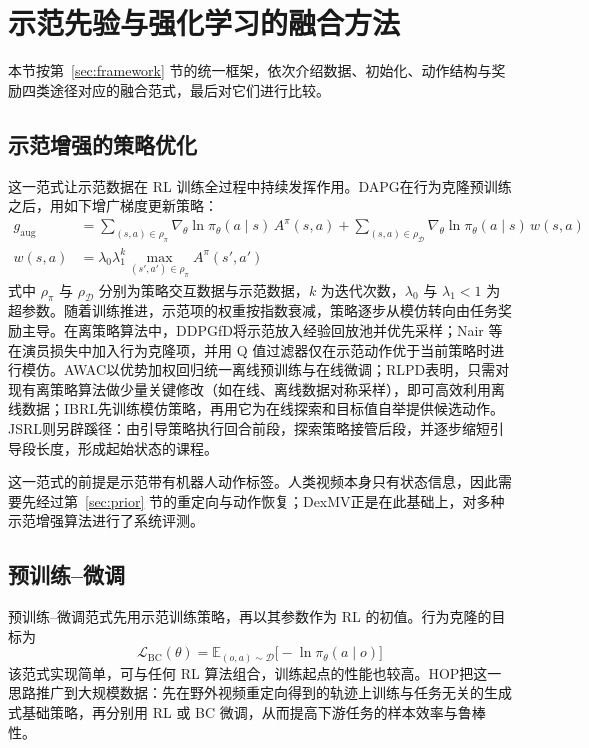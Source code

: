 \documentclass[UTF8,a4paper,zihao=-4]{ctexart}
\begin{document}
\section{示范先验与强化学习的融合方法}\label{sec:fusion}

本节按第~\ref{sec:framework} 节的统一框架，依次介绍数据、初始化、动作结构与奖励四类途径对应的融合范式，最后对它们进行比较。

\subsection{示范增强的策略优化}\label{sec:augment}

这一范式让示范数据在 RL 训练全过程中持续发挥作用。DAPG\cite{dapg}在行为克隆预训练之后，用如下增广梯度更新策略：
\begin{equation}\label{eq:dapg}
\begin{aligned}
  g_{\mathrm{aug}}&=\sum_{(s,a)\in\rho_{\pi}}\nabla_{\theta}\ln\pi_{\theta}(a\mid s)\,A^{\pi}(s,a)+\sum_{(s,a)\in\rho_{\mathcal{D}}}\nabla_{\theta}\ln\pi_{\theta}(a\mid s)\,w(s,a)\\
  w(s,a)&=\lambda_{0}\lambda_{1}^{k}\max_{(s',a')\in\rho_{\pi}}A^{\pi}(s',a')
\end{aligned}
\end{equation}
式中 $\rho_\pi$ 与 $\rho_{\mathcal{D}}$ 分别为策略交互数据与示范数据，$k$ 为迭代次数，$\lambda_0$ 与 $\lambda_1<1$ 为超参数。随着训练推进，示范项的权重按指数衰减，策略逐步从模仿转向由任务奖励主导。在离策略算法中，DDPGfD\cite{ddpgfd}将示范放入经验回放池并优先采样；Nair 等\cite{nair2018}在演员损失中加入行为克隆项，并用 Q 值过滤器仅在示范动作优于当前策略时进行模仿。AWAC\cite{awac}以优势加权回归统一离线预训练与在线微调；RLPD\cite{rlpd}表明，只需对现有离策略算法做少量关键修改（如在线、离线数据对称采样），即可高效利用离线数据；IBRL\cite{ibrl}先训练模仿策略，再用它为在线探索和目标值自举提供候选动作。JSRL\cite{jsrl}则另辟蹊径：由引导策略执行回合前段，探索策略接管后段，并逐步缩短引导段长度，形成起始状态的课程。

这一范式的前提是示范带有机器人动作标签。人类视频本身只有状态信息，因此需要先经过第~\ref{sec:prior} 节的重定向与动作恢复；DexMV\cite{dexmv}正是在此基础上，对多种示范增强算法进行了系统评测。

\subsection{预训练–微调}\label{sec:pretrain}

预训练–微调范式先用示范训练策略，再以其参数作为 RL 的初值。行为克隆的目标为
\begin{equation}\label{eq:bc}
  \mathcal{L}_{\mathrm{BC}}(\theta)=\mathbb{E}_{(o,a)\sim\mathcal{D}}\big[-\ln\pi_{\theta}(a\mid o)\big]
\end{equation}
该范式实现简单，可与任何 RL 算法组合，训练起点的性能也较高。HOP\cite{hop}把这一思路推广到大规模数据：先在野外视频重定向得到的轨迹上训练与任务无关的生成式基础策略，再分别用 RL 或 BC 微调，从而提高下游任务的样本效率与鲁棒性。
\end{document}

